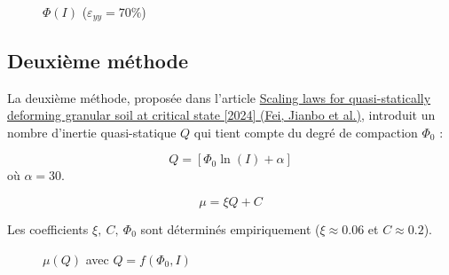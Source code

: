 \documentclass[a4paper,12pt]{report}
\begin{document}
\begin{figure}
    \centering
    {\small
        
    }
    \caption{$\Phi(I)$ ($\varepsilon_{yy} = 70\%$)}
\end{figure}

\subsection{Deuxième méthode}

La deuxième méthode, proposée dans l'article 
\href{https://link-springer-com.sid2nomade-1.grenet.fr/article/10.1007/s10035-024-01459-7}{Scaling laws for quasi-statically deforming granular soil at critical state [2024] (Fei, Jianbo et al.)}, 
introduit un nombre d'inertie quasi-statique $Q$ qui tient compte du degré de compaction $\Phi_0$ :

\[
Q = \left[ \Phi_0  \ln \left( I \right) + \alpha \right]
\]
où $\alpha = 30$.

\[
\mu = \xi Q + C
\]

Les coefficients $\xi,\ C,\ \Phi_0$ sont déterminés empiriquement ($\xi \approx 0.06$ et $C \approx 0.2$).

\begin{figure}
    \centering
    {\small
        
    }
    \caption{$\mu(Q)$ avec $Q = f(\Phi_0, I)$}
\end{figure}





\nocite{*}
\end{document}

